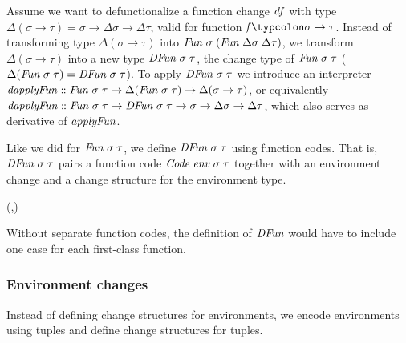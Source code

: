 Assume we want to defunctionalize a function change \ensuremath{\Varid{df}} with type \ensuremath{\Delta (\sigma\to \tau)\mathrel{=}\sigma\to \Delta \sigma\to \Delta \tau}, valid for function \ensuremath{\Varid{f}\typcolon\sigma\to \tau}.
Instead of transforming type \ensuremath{\Delta (\sigma\to \tau)} into \ensuremath{\Conid{Fun}\;\sigma\;(\Conid{Fun}\;\Delta \sigma\;\Delta \tau)}, we transform \ensuremath{\Delta (\sigma\to \tau)} into a new type \ensuremath{\Conid{DFun}\;\sigma\;\tau}, the
change type of \ensuremath{\Conid{Fun}\;\sigma\;\tau} (\ensuremath{\Delta (\Conid{Fun}\;\sigma\;\tau)\mathrel{=}\Conid{DFun}\;\sigma\;\tau}).
%
To apply \ensuremath{\Conid{DFun}\;\sigma\;\tau} we introduce an interpreter \ensuremath{\Varid{dapplyFun}\mathrel{:\mkern-1mu:}\Conid{Fun}\;\sigma\;\tau\to \Delta (\Conid{Fun}\;\sigma\;\tau)\to \Delta (\sigma\to \tau)}, or equivalently \ensuremath{\Varid{dapplyFun}\mathrel{:\mkern-1mu:}\Conid{Fun}\;\sigma\;\tau\to \Conid{DFun}\;\sigma\;\tau\to \sigma\to \Delta \sigma\to \Delta \tau}, which also
serves as derivative of \ensuremath{\Varid{applyFun}}.

Like we did for \ensuremath{\Conid{Fun}\;\sigma\;\tau}, we define \ensuremath{\Conid{DFun}\;\sigma\;\tau} using function
codes. That is, \ensuremath{\Conid{DFun}\;\sigma\;\tau} pairs a function code \ensuremath{\Conid{Code}\;\Varid{env}\;\sigma\;\tau}
together with an environment change and a change structure for the environment
type.

\begin{hscode}\SaveRestoreHook
{}%
%
\>[B]{}\;\;\sigma\;\tau\mathrel{=}\forall {}\hsforall {}\;\Rightarrow{}\;(\Delta {},\;\;\sigma\;\tau){}\<[E]%
\ColumnHook
\end{hscode}\resethooks

Without separate function codes, the definition of \ensuremath{\Conid{DFun}} would have to include
one case for each first-class function.

\subsubsection{Environment changes}
\label{sec:defunc-env-changes}
Instead of defining change structures for environments, we encode environments
using tuples and define change structures for tuples.

